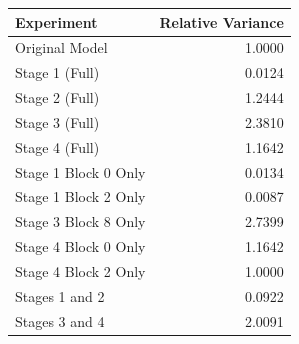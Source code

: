 \begin{tabular}{lr}
\toprule
Experiment & Relative Variance \\
\midrule
Original Model & 1.0000 \\
Stage 1 (Full) & 0.0124 \\
Stage 2 (Full) & 1.2444 \\
Stage 3 (Full) & 2.3810 \\
Stage 4 (Full) & 1.1642 \\
Stage 1 Block 0 Only & 0.0134 \\
Stage 1 Block 2 Only & 0.0087 \\
Stage 3 Block 8 Only & 2.7399 \\
Stage 4 Block 0 Only & 1.1642 \\
Stage 4 Block 2 Only & 1.0000 \\
Stages 1 and 2 & 0.0922 \\
Stages 3 and 4 & 2.0091 \\
\bottomrule
\end{tabular}
